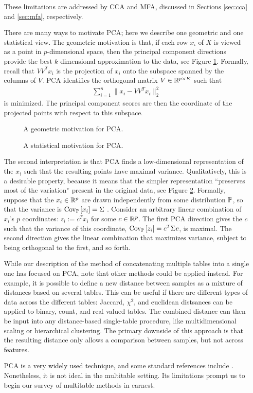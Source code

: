 \documentclass{article}
\begin{document}
These limitations are addressed by CCA and MFA, discussed in Sections
\ref{sec:cca} and \ref{sec:mfa}, respectively.

There are many ways to motivate PCA; here we describe one geometric
and one statistical view. The geometric motivation is that, if each
row $x_{i}$ of $X$ is viewed as a point in $p$-dimensional space, then
the principal component directions provide the best $k$-dimensional
approximation to the data, see Figure \ref{fig:pca-approx}. Formally,
recall that $VV^{T}x_{i}$ is the projection of $x_{i}$ onto the
subspace spanned by the columns of $V$. PCA identifies the orthogonal
matrix $V \in \reals^{p \times K}$ such that
\begin{align}
\sum_{i = 1}^{n}\|x_{i} - VV^{T} x_{i}\|_{2}^{2}
\end{align}
is minimized. The principal component scores are then the coordinate
of the projected points with respect to this subspace.

\begin{figure}
  \caption{A geometric motivation for PCA.}
  \label{fig:pca-approx}
\end{figure}

\begin{figure}
  \caption{A statistical motivation for PCA.}
  \label{fig:pca-var}
\end{figure}

The second interpretation is that PCA finds a low-dimensional
representation of the $x_{i}$ such that the resulting points have
maximal variance. Qualitatively, this is a desirable
property, because it means that the simpler representation
``preserves most of the variation'' present in the original
data, see Figure \ref{fig:pca-var}. Formally, suppose that the
$x_{i}\in\reals^{p}$ are drawn independently from some distribution
$\P$, so that the variance is $\Covsubarg{\P}{x_{i}} = \Sigma$
. Consider an arbitrary linear combination of $x_{i}$'s $p$
coordinates: $z_{i} := c^{T}x_{i}$ for some $c \in \reals^{p}$. The
first PCA direction gives the $c$ such that the variance of this
coordinate, $\Covsubarg{\P}{z_{i}} = c^{T}\Sigma c$, is maximal. The
second direction gives the linear combination that maximizes variance,
subject to being orthogonal to the first, and so forth.

While our description of the method of concatenating multiple tables
into a single one has focused on PCA, note that other
methods could be applied instead. For example, it is possible to define a new
distance between samples as a mixture of distances based on several
tables. This can be useful if there are different types of data across
the different tables: Jaccard, $\chi^{2}$, and euclidean distsances
can be applied to binary, count, and real valued tables. The combined
distance can then be input into any distance-based single-table
procedure, like multidimensional scaling or hierarchical
clustering. The primary downside of this approach is that the
resulting distance only allows a comparison between samples, but not
across features.

PCA is a very widely used technique, and some standard references
include \cite{friedman2001elements, mardia1980multivariate,
  pages2014multiple}. Nonetheless, it is not ideal in the multitable
setting. Its limitations prompt us to begin our survey of multitable
methods in earnest.
\end{document}
